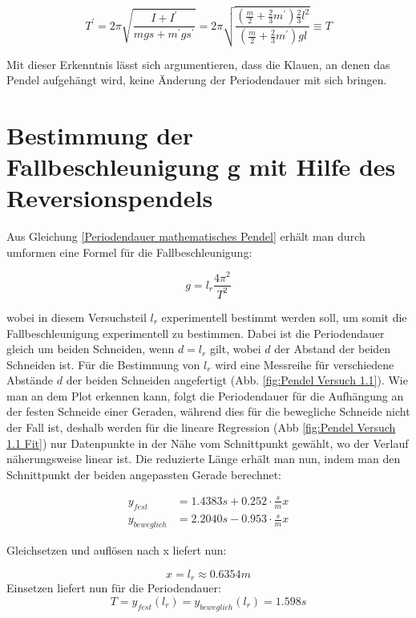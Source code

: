\begin{equation}
    T^\prime = 2 \pi \sqrt{\frac{I + I^\prime}{mgs+m^\prime g s^\prime }} = 2\pi \sqrt{ \frac{ (\frac{m}{2} + \frac{2}{3} m^\prime) \frac{2}{3}l^2} { (\frac{m}{2} + \frac{2}{3}m^\prime)g l  }} \equiv T
\end{equation}

Mit dieser Erkenntnis lässt sich argumentieren, dass die Klauen, an denen das Pendel aufgehängt wird, keine Änderung der Periodendauer mit sich bringen.

\section{Bestimmung der Fallbeschleunigung g mit Hilfe des Reversionspendels}

Aus Gleichung \ref{Periodendauer mathematisches Pendel} erhält man durch umformen eine Formel für die Fallbeschleunigung: 

\begin{equation} \label{Fallbeschleunigung mathematisches Pendel}
    g = l_r \frac{4 \pi^2}{T^2}
\end{equation}

wobei in diesem Versuchsteil $l_r$ experimentell bestimmt werden soll, um somit die Fallbeschleunigung experimentell zu bestimmen. Dabei ist die Periodendauer gleich um beiden Schneiden, wenn $d = l_r$ gilt, wobei $d$ der Abstand der beiden Schneiden ist. Für die Bestimmung von $l_r$ wird eine Messreihe für verschiedene Abstände $d$ der beiden Schneiden angefertigt (Abb. \ref{fig:Pendel Versuch 1.1}). Wie man an dem Plot erkennen kann, folgt die Periodendauer für die Aufhängung an der festen Schneide einer Geraden, während dies für die bewegliche Schneide nicht der Fall ist, deshalb werden für die lineare Regression (Abb \ref{fig:Pendel Versuch 1.1 Fit}) nur Datenpunkte in der Nähe vom Schnittpunkt gewählt, wo der Verlauf näherungsweise linear ist. Die reduzierte Länge erhält man nun, indem man den Schnittpunkt der beiden angepassten Gerade berechnet:

\begin{align} 
    \nonumber y_{fest} &=  1.4383s + 0.252 \cdot \frac{s}{m} x\\
    \nonumber y_{beweglich} &= 2.2040s -0.953 \cdot \frac{s}{m} x
\end{align}

Gleichsetzen und auflösen nach x liefert nun:

    $$x=l_r \approx 0.6354m $$
    Einsetzen liefert nun für die Periodendauer:
    $$T = y_{fest}(l_r) = y_{beweglich}(l_r) = 1.598 s$$

